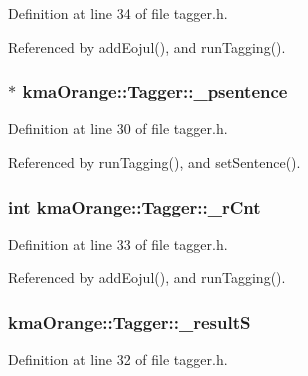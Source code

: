 Definition at line 34 of file tagger.h.

Referenced by addEojul(), and runTagging().\hypertarget{classkmaOrange_1_1Tagger_aea88aa4cfbe20663a74de573b5c5631}{
\subsubsection[{\_\-psentence}]{$\ast$ {\bf kmaOrange::Tagger::\_\-psentence}}}
\label{classkmaOrange_1_1Tagger_aea88aa4cfbe20663a74de573b5c5631}




Definition at line 30 of file tagger.h.

Referenced by runTagging(), and setSentence().\hypertarget{classkmaOrange_1_1Tagger_bb6d57b5e78be85d37b83f63dd5d29f9}{
\subsubsection[{\_\-rCnt}]{\setlength{\rightskip}{0pt plus 5cm}int {\bf kmaOrange::Tagger::\_\-rCnt}}}
\label{classkmaOrange_1_1Tagger_bb6d57b5e78be85d37b83f63dd5d29f9}




Definition at line 33 of file tagger.h.

Referenced by addEojul(), and runTagging().\hypertarget{classkmaOrange_1_1Tagger_0772dae32ba7bbd31122e4bfe0967b0b}{
\subsubsection[{\_\-resultS}]{ {\bf kmaOrange::Tagger::\_\-resultS}}}
\label{classkmaOrange_1_1Tagger_0772dae32ba7bbd31122e4bfe0967b0b}




Definition at line 32 of file tagger.h.

